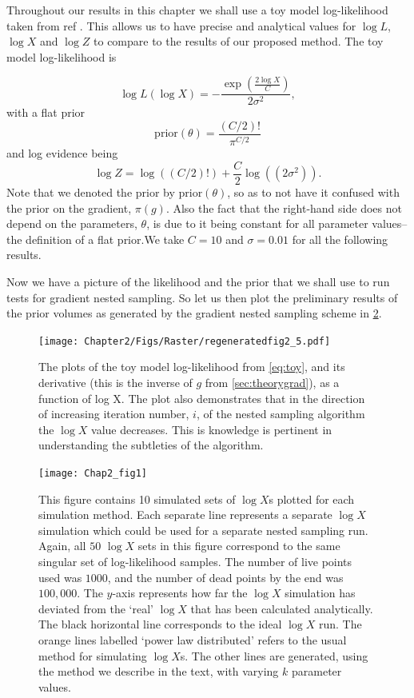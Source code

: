 Throughout our results in this chapter we shall use a toy model log-likelihood taken from ref \cite{10.1214/06-BA127}. This allows us to have precise and analytical values for $\log L$, $\log X$ and $\log Z$ to compare to the results of our proposed method. The toy model log-likelihood is

\begin{equation}
    \log L(\log X) = -\frac{\exp (\frac{2\log X}{C}) }{2 \sigma^2},
\label{eq:toy}
\end{equation}
%
with a flat prior 
%
\begin{equation}
    \mathrm{prior}(\theta) = \frac{(C/2)!}{\pi^{C/2}}
\end{equation}
%
and log evidence being 
%
\begin{equation}
   \log Z = \log( (C/2)!) + \frac{C}{2}\log ((2\sigma^2)).
\end{equation}
%
Note that we denoted the prior by $\mathrm{prior}(\theta)$, so as to not have it confused with the prior on the gradient, $\pi(g)$. Also the fact that the right-hand side does not depend on the parameters, $\theta$, is due to it being constant for all parameter values--the definition of a flat prior.We take $C=10$ and $\sigma = 0.01$ for all the following results.

Now we have a picture of the likelihood and the prior that we shall use to run tests for gradient nested sampling. So let us then plot the preliminary results of the prior volumes as generated by the gradient nested sampling scheme in \cref{fig:logX1}.
%

\begin{figure} 
\centering    
\texttt{[image: Chapter2/Figs/Raster/regeneratedfig2\_5.pdf]}
\caption{ The plots of the toy model log-likelihood from \cref{eq:toy}, and its derivative (this is the inverse of $g$ from \cref{sec:theorygrad}), as a function of log X. The plot also demonstrates that in the direction of increasing iteration number, $i$, of the nested sampling algorithm the $\log X$ value decreases. This is knowledge is pertinent in understanding the subtleties of the algorithm.}
\label{fig:expo}
\end{figure}


\begin{figure} 
\centering    
\texttt{[image: Chap2\_fig1]}
\caption{This figure contains 10 simulated sets of $\log X$s plotted for each simulation method. Each separate line represents a separate $\log X$ simulation which could be used for a separate nested sampling run. Again, all $50$ $\log X$ sets in this figure correspond to the same singular set of log-likelihood samples. The number of live points used was $1000$, and the number of dead points by the end was $100,000$. The $y$-axis represents how far the $\log X$ simulation has deviated from the `real' $\log X$ that has been calculated analytically. The black horizontal line corresponds to the ideal $\log X$ run. The orange lines labelled `power law distributed' refers to the usual method for simulating $\log X$s. The other lines are generated, using the method we describe in the text, with varying $k$ parameter values.}
\label{fig:logX1}
\end{figure}

